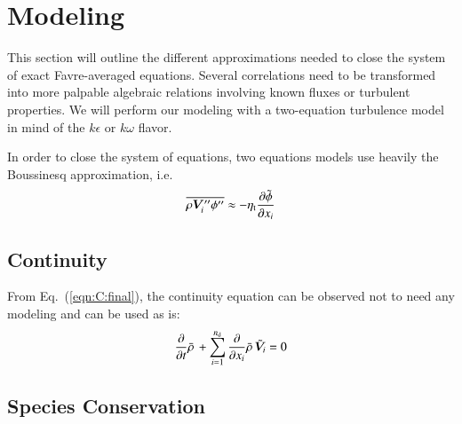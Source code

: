 \documentclass{warpdoc}
\newcommand{\nd}{{{n}_{\rm d}}}
\newcommand{\turb}{_{\rm t}}
\newcommand{\etat}{{\eta\turb}}
\newcommand{\mfd}{\displaystyle}
\begin{document}
\section{Modeling}

This section will outline the different approximations needed
to close the system of exact Favre-averaged equations. Several correlations
need to be transformed into more palpable algebraic relations involving
known fluxes or turbulent properties. We will perform our modeling with
a two-equation turbulence model in mind of the $k\epsilon$ or $k\omega$
flavor.

In order to close the system of equations, two equations models
use heavily the Boussinesq approximation, i.e.
%
\begin{equation}
  \overline{\rho  \bm{V}_i^{{\prime\prime}}  \phi^{{\prime\prime}}}   \approx   -\etat  \frac{\partial \wtilde{\phi}}{\partial x_i}
  \label{eqn:boussinesq}
\end{equation}
%






\subsection{Continuity}

From Eq.\ (\ref{eqn:C:final}), the continuity equation can be observed not
to need any modeling and can be used as is:
%
\begin{equation}
    \mfd\frac{\partial}{\partial t} \wbar{\rho}\,
     + \sum_{i=1}^{\nd}
       \frac{\partial}{\partial x_i}
          \wbar{\rho}\, {\wtilde{\bm{V}}_i}
           =0 
    \label{eqn:C:modeled:final}
\end{equation}
%






\subsection{Species Conservation}
\end{document}
